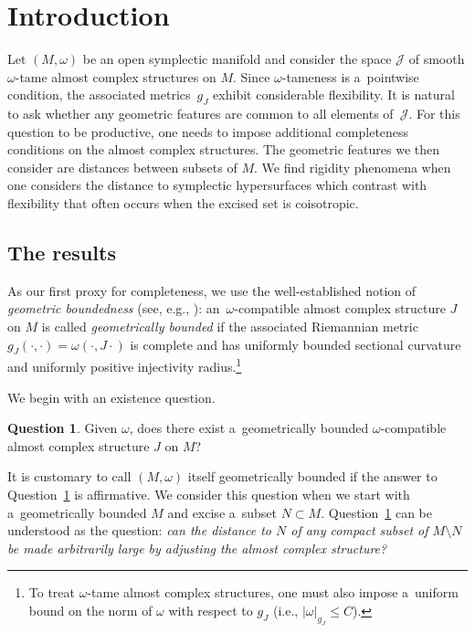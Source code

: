 \documentclass[pdftex]{sigma}
\numberwithin{equation}{section}
\theoremstyle{definition}
\newtheorem{ques}[Theorem]{Question}
\begin{document}
\renewcommand{\thefootnote}{\arabic{footnote}}
\setcounter{footnote}{0}

\section{Introduction}
Let $(M,\omega)$ be an open symplectic manifold and consider the space $\mathcal{J}$ of smooth $\omega$-tame almost complex structures on $M$. Since $\omega$-tameness is a~pointwise condition, the associated metrics~$g_J$ exhibit considerable flexibility. It is natural to ask whether any geometric features are common to all elements of~$\mathcal{J}$. For this question to be productive, one needs to impose additional completeness conditions on the almost complex structures. The geometric features we then consider are distances between subsets of $M$. We find rigidity phenomena when one considers the distance to symplectic hypersurfaces which contrast with flexibility that often occurs when the excised set is coisotropic.

\subsection{The results}
As our first proxy for completeness, we use the well-established notion of \emph{geometric boundedness} (see, e.g., \cite[Section~4.2]{Sikorav}): an~$\omega$-compatible almost complex structure $J$ on $M$ is called \emph{geometrically bounded} if the associated Riemannian metric $g_J(\cdot,\cdot)=\omega(\cdot,J\cdot)$ is complete and has uniformly bounded sectional curvature and uniformly positive injectivity radius.\footnote{To treat $\omega$-tame almost complex structures, one must also impose a~uniform bound on the norm of $\omega$ with respect to $g_J$ (i.e., $|\omega|_{g_J}\le C$).}

We begin with an existence question.
\begin{ques}\label{ques:1}
Given $\omega$, does there exist a~geometrically bounded $\omega$-compatible almost complex structure $J$ on $M$?
\end{ques}
It is customary to call $(M,\omega)$ itself geometrically bounded if the answer to Question~\ref{ques:1} is affirmative. We consider this question when we start with a~geometrically bounded $M$ and excise a~subset $N\subset M$. Question~\ref{ques:1} can be understood as the question: \emph{can the distance to $N$ of any compact subset of $M\setminus N$ be made arbitrarily large by adjusting the almost complex structure?}
\end{document}
